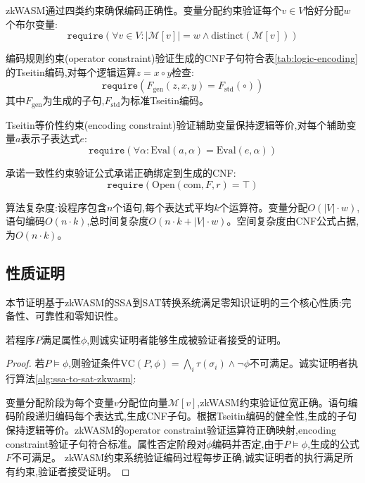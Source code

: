 zkWASM通过四类约束确保编码正确性。变量分配约束验证每个$v \in V$恰好分配$w$个布尔变量:
\begin{equation}
\texttt{require}\left(\forall v \in V: |\mathcal{M}[v]| = w \wedge \text{distinct}(\mathcal{M}[v])\right)
\end{equation}

编码规则约束(operator constraint)验证生成的CNF子句符合表\ref{tab:logic-encoding}的Tseitin编码,对每个逻辑运算$z = x \circ y$检查:
\begin{equation}
\texttt{require}\left(F_{\text{gen}}(z, x, y) = F_{\text{std}}(\circ)\right)
\end{equation}
其中$F_{\text{gen}}$为生成的子句,$F_{\text{std}}$为标准Tseitin编码。

Tseitin等价性约束(encoding constraint)验证辅助变量保持逻辑等价,对每个辅助变量$a$表示子表达式$e$:
\begin{equation}
\texttt{require}\left(\forall \alpha: \text{Eval}(a, \alpha) = \text{Eval}(e, \alpha)\right)
\end{equation}

承诺一致性约束验证公式承诺正确绑定到生成的CNF:
\begin{equation}
\texttt{require}\left(\text{Open}(\text{com}, F, r) = \top\right)
\end{equation}

算法复杂度:设程序包含$n$个语句,每个表达式平均$k$个运算符。变量分配$O(|V| \cdot w)$,语句编码$O(n \cdot k)$,总时间复杂度$O(n \cdot k + |V| \cdot w)$。空间复杂度由CNF公式占据,为$O(n \cdot k)$。

\subsection{性质证明}

本节证明基于zkWASM的SSA到SAT转换系统满足零知识证明的三个核心性质:完备性、可靠性和零知识性。

\begin{theorem}[完备性]
若程序$P$满足属性$\phi$,则诚实证明者能够生成被验证者接受的证明。
\end{theorem}

\begin{proof}
若$P \models \phi$,则验证条件$\text{VC}(P, \phi) = \bigwedge_{i} \tau(\sigma_i) \wedge \neg\phi$不可满足。诚实证明者执行算法\ref{alg:ssa-to-sat-zkwasm}:

变量分配阶段为每个变量$v$分配位向量$\mathcal{M}[v]$,zkWASM约束验证位宽正确。语句编码阶段递归编码每个表达式,生成CNF子句。根据Tseitin编码的健全性,生成的子句保持逻辑等价。zkWASM的operator constraint验证运算符正确映射,encoding constraint验证子句符合标准。属性否定阶段对$\phi$编码并否定,由于$P \models \phi$,生成的公式$F$不可满足。
zkWASM约束系统验证编码过程每步正确,诚实证明者的执行满足所有约束,验证者接受证明。
\end{proof}

